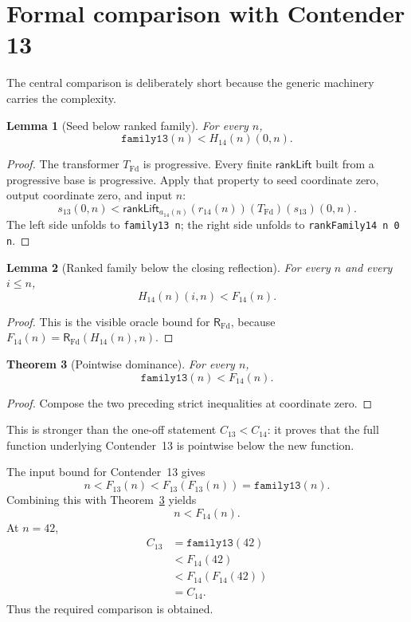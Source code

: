 \documentclass[11pt]{article}
\newtheorem{theorem}{Theorem}[section]
\newtheorem{lemma}[theorem]{Lemma}
\theoremstyle{definition}
\theoremstyle{remark}
\newcommand{\RFd}{\mathsf{R}_{\mathrm{Fd}}}
\newcommand{\lean}[1]{\texttt{#1}}
\begin{document}
\section{Formal comparison with Contender 13}

The central comparison is deliberately short because the generic machinery
carries the complexity.

\begin{lemma}[Seed below ranked family]
For every \(n\),
\[
  \lean{family13}(n)<H_{14}(n)(0,n).
\]
\end{lemma}

\begin{proof}
The transformer \(T_{\mathrm{Fd}}\) is progressive.  Every finite
\(\mathsf{rankLift}\) built from a progressive base is progressive.  Apply that
property to seed coordinate zero, output coordinate zero, and input \(n\):
\[
  s_{13}(0,n)<
  \mathsf{rankLift}_{a_{14}(n)}(r_{14}(n))
    (T_{\mathrm{Fd}})(s_{13})(0,n).
\]
The left side unfolds to \lean{family13 n}; the right side unfolds to
\lean{rankFamily14 n 0 n}.
\end{proof}

\begin{lemma}[Ranked family below the closing reflection]
For every \(n\) and every \(i\le n\),
\[
  H_{14}(n)(i,n)<F_{14}(n).
\]
\end{lemma}

\begin{proof}
This is the visible oracle bound for \(\RFd\), because
\(F_{14}(n)=\RFd(H_{14}(n),n)\).
\end{proof}

\begin{theorem}[Pointwise dominance]
\label{thm:pointwise}
For every \(n\),
\[
  \lean{family13}(n)<F_{14}(n).
\]
\end{theorem}

\begin{proof}
Compose the two preceding strict inequalities at coordinate zero.
\end{proof}

This is stronger than the one-off statement \(C_{13}<C_{14}\): it proves that
the full function underlying Contender~13 is pointwise below the new function.

The input bound for Contender~13 gives
\[
  n<F_{13}(n)<F_{13}(F_{13}(n))=\lean{family13}(n).
\]
Combining this with Theorem~\ref{thm:pointwise} yields
\[
  n<F_{14}(n).
\]
At \(n=42\),
\[
\begin{aligned}
C_{13}
 &=\lean{family13}(42)\\
 &<F_{14}(42)\\
 &<F_{14}(F_{14}(42))\\
 &=C_{14}.
\end{aligned}
\]
Thus the required comparison is obtained.
\end{document}
